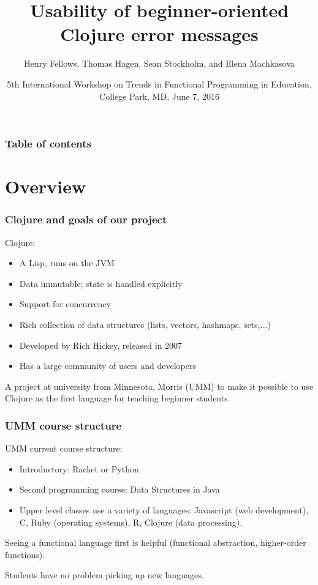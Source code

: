 \documentclass{beamer}
\begin{document}
\title{Usability of beginner-oriented Clojure error messages}
\author{Henry Fellows, Thomas Hagen, Sean Stockholm, 
and Elena Machkasova}
\date{5th International Workshop on Trends in Functional Programming in Education, \\
College Park, MD, June 7, 2016}

\begin{frame}
\titlepage
\end{frame}

\begin{frame}
\frametitle{Table of contents}
\tableofcontents  
\end{frame}

\section{Overview}

\begin{frame}
\frametitle{Clojure and goals of our project }
Clojure:
\begin{itemize}
\item A Lisp, runs on the JVM
\item Data immutable; state is handled explicitly 
\item Support for concurrency 
\item Rich collection of data structures (lists, vectors, hashmaps, sets,...)
\item Developed by Rich Hickey, released in 2007
\item Has a large community of users and developers 
\end{itemize}

A project at university from Minnesota, Morris (UMM) to make it possible to use Clojure as the first language for teaching beginner students. 
\end{frame}

\begin{frame}
\frametitle{UMM course structure}
UMM current course structure:
\begin{itemize}
\item Introductory: Racket or Python 
\item Second programming course: Data Structures in Java
\item Upper level classes use a variety of languages:  Javascript (web development), C, Ruby (operating systems),  R, Clojure (data processing). 
\end{itemize} 
Seeing a functional language first is helpful (functional abstraction, higher-order functions). 

Students have no problem picking up new languages. 
\end{frame}
\end{document}
